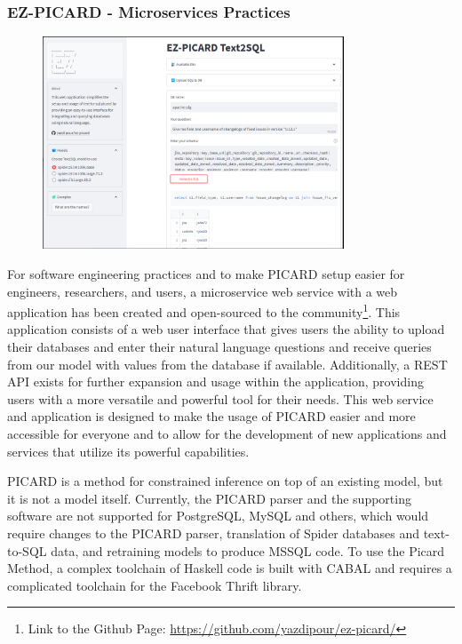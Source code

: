 \subsubsection{EZ-PICARD - Microservices Practices}

\begin{figure}[h]
    \centering
    \includegraphics[width=0.8\textwidth]{pics/ez/ui.png}
    \label{fig:ezpicard}
\end{figure}

For software engineering practices and to make PICARD setup easier for engineers, researchers, and users, a microservice web service with a web application has been created and open-sourced to the community\footnote[1]{Link to the Github Page: \url{https://github.com/yazdipour/ez-picard/}}. This application consists of a web user interface that gives users the ability to upload their databases and enter their natural language questions and receive queries from our model with values from the database if available. Additionally, a REST API exists for further expansion and usage within the application, providing users with a more versatile and powerful tool for their needs. This web service and application is designed to make the usage of PICARD easier and more accessible for everyone and to allow for the development of new applications and services that utilize its powerful capabilities.

PICARD is a method for constrained inference on top of an existing model, but it is not a model itself. Currently, the PICARD parser and the supporting software are not supported for PostgreSQL, MySQL and others, which would require changes to the PICARD parser, translation of Spider databases and text-to-SQL data, and retraining models to produce MSSQL code. To use the Picard Method, a complex toolchain of Haskell code is built with CABAL and requires a complicated toolchain for the Facebook Thrift library.

